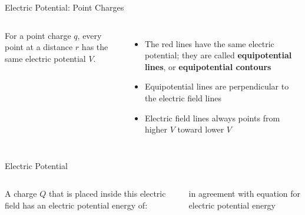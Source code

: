 \documentclass[12pt,aspectratio=169]{beamer}
\begin{document}
\begin{frame}{Electric Potential: Point Charges}
  \begin{columns}
    \centering
 
    For a point charge $q$, every point at a distance $r$ has the same
    electric potential $V$.
    \begin{itemize}
    \item The red lines have the same electric potential; they are called
      \textbf{equipotential lines}, or \textbf{equipotential contours}
    \item Equipotential lines are perpendicular to the electric field lines
    \item Electric field lines always points from higher $V$ toward lower $V$

    \end{itemize}
  \end{columns}
\end{frame}



\begin{frame}{Electric Potential}
  \begin{columns}
    \centering
    
    A charge $Q$ that is placed inside this electric field has an electric
    potential energy of:


    in agreement with equation for electric potential energy
  \end{columns}
\end{frame}
\end{document}
